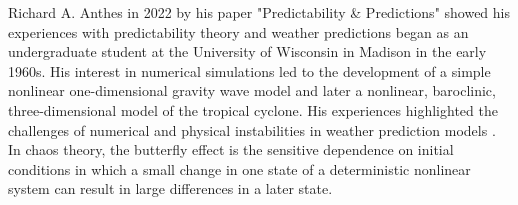 Richard A. Anthes in 2022 by his paper "Predictability \& Predictions" showed his experiences with predictability theory and weather predictions began as an undergraduate student at the University of Wisconsin in Madison in the early 1960s. His interest in numerical simulations led to the development of a simple nonlinear one-dimensional gravity wave model and later a nonlinear, baroclinic, three-dimensional model of the tropical cyclone. His experiences highlighted the challenges of numerical and physical instabilities in weather prediction models \cite{atmos13081292}. \cite{encyclopedia2030084}
In chaos theory, the butterfly effect is the sensitive dependence on initial conditions in which a small change in one state of a deterministic nonlinear system can result in large differences in a later state.